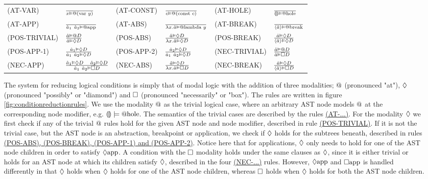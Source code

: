 \begin{figure*}
  \center
  \renewcommand{\arraystretch}{2}
  \begin{tabular}{llllll}
    \scriptsize(AT-VAR)      & $\frac{} {x \vDash @(\text{var }y)}$      & \scriptsize(AT-CONST)  & $\frac{} {c \vDash @(\text{const }c)}$   & \scriptsize(AT-HOLE)   & $\frac{} {\llparenthesis\rrparenthesis \vDash @\text{hole}}$   \\
    \scriptsize(AT-APP)      & $\frac{} {\hat{a}_1~\hat{a}_2 \vDash @\text{app}}$      & \scriptsize(AT-ABS)    & $\frac{} {\lambda x.\hat{a} \vDash @\text{lambda }y}$     & \scriptsize(AT-BREAK)  & $\frac{} {\langle \hat{a} \rangle \vDash @\text{break}}$  \\
    \scriptsize(POS-TRIVIAL) & $\frac{\hat{a} \vDash @D} {\hat{a} \vDash \Diamond D}$ & \scriptsize(POS-ABS)   & $\frac{\hat{a} \vDash \Diamond D} {\lambda x.\hat{a} \vDash \Diamond D}$    & \scriptsize(POS-BREAK) & $\frac{\hat{a} \vDash \Diamond D} {\langle \hat{a} \rangle \vDash \Diamond D}$ \\
    \scriptsize(POS-APP-1)   & $\frac{\hat{a}_1 \vDash \Diamond D} {\hat{a}_1~\hat{a}_2 \vDash \Diamond D}$  & \scriptsize(POS-APP-2) & $\frac{\hat{a}_2 \vDash \Diamond D} {\hat{a}_1~\hat{a}_2 \vDash \Diamond D}$ &   \scriptsize(NEC-TRIVIAL) & $\frac{\hat{a} \vDash @D} {\hat{a} \vDash \Box D}$ \\
    \scriptsize(NEC-APP)     & $\frac{\hat{a}_1 \vDash \Diamond D\quad\hat{a}_2 \vDash \Diamond D} {\hat{a}_1~\hat{a}_2 \vDash \Box D}$     & \scriptsize(NEC-ABS)   & $\frac{\hat{a} \vDash \Diamond D} {\lambda x.\hat{a} \vDash \Box D}$    & \scriptsize(NEC-BREAK) & $\frac{\hat{a} \vDash \Diamond D} {\langle \hat{a} \rangle \vDash \Box D}$
  \end{tabular}
  \caption{Condition reduction rules}
  \label{fig:conditionreductionrules}
\end{figure*}

The system for reducing logical conditions is simply that of modal logic with
the addition of three modalities; $\at$ (pronounced "at"), $\possibly$
(pronounced "possibly" or "diamond") and $\necessarily$ (pronounced
"necessarily" or "box"). The rules are written in figure
\ref{fig:conditionreductionrules}. We use the modality $\at$ as the trivial
logical case, where an arbitrary AST node models $\at$ at the corresponding
node modifier, e.g. $\llparenthesis\rrparenthesis \models @\text{hole}$. The semantics of the
trivial cases are described by the rules
\hyperref[fig:conditionreductionrules]{(AT-...)}. For the modality $\possibly$
we first check if any of the trivial $\at$ rules hold for the given AST node
and node modifier, described in rule
\hyperref[fig:conditionreductionrules]{(POS-TRIVIAL)}. If it is not the trivial
case, but the AST node is an abstraction, breakpoint or application, we check
if $\possibly$ holds for the subtrees beneath, described in rules
\hyperref[fig:conditionreductionrules]{(POS-ABS), (POS-BREAK), (POS-APP-1) and
(POS-APP-2)}. Notice here that for applications, $\possibly$ only needs to hold
for one of the AST node children in order to satisfy $\Diamond \text{app}$. A
condition with the $\necessarily$ modality holds under the same clauses as
$\possibly$, since it is either trivial or holds for an AST node at which its
children satisfy $\possibly$, described in the four
\hyperref[fig:conditionreductionrules]{(NEC-...)} rules. However,
$\Diamond \text{app}$ and $\Box \text{app}$ is handled differently in
that $\possibly$ holds when $\possibly$ holds for one of the AST node children,
whereas $\necessarily$ holds when $\possibly$ holds for both the AST node
children. \\

